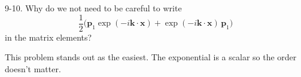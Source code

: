 \documentclass[12pt]{article}
\begin{document}
9-10.
Why do we not need to be careful to write
\begin{equation*}
\frac{1}{2}
\big(
\mathbf p_1\exp(-i\mathbf k\cdot\mathbf x)
+\exp(-i\mathbf k\cdot\mathbf x)\,\mathbf p_1
\big)
\end{equation*}
in the matrix elements?

\bigskip
This problem stands out as the easiest.
The exponential is a scalar so the order doesn't matter.
\end{document}
